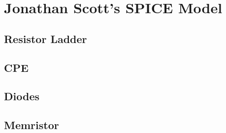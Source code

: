 \section{Jonathan Scott's SPICE Model}
\subsection{Resistor Ladder}
\subsection{CPE}
\subsection{Diodes}
\subsection{Memristor}